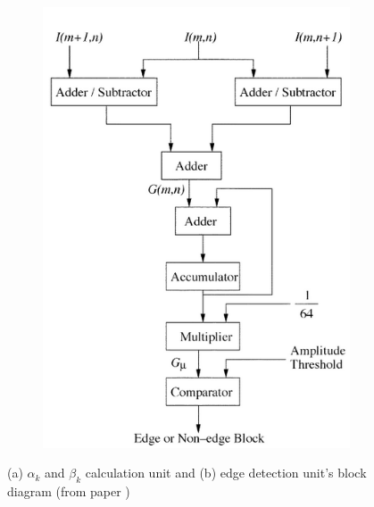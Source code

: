 \documentclass[letterpaper, 11pt]{article}
\begin{document}
\begin{figure}[ht!]
\begin{subfigure}[b]{.35\linewidth}
			\caption{}
			\label{fig2a}
		\end{subfigure}
		\begin{subfigure}[b]{.35\linewidth}
			\includegraphics[width=\textwidth]{report_pics/edge_unit_block_diagram.png}
			\caption{}
			\label{fig2b}
		\end{subfigure}
		\caption{(a) $\alpha_k$ and $\beta_k$ calculation unit and (b) edge detection unit's block diagram (from paper \cite{1})}
	\end{figure}
	
\end{document}
